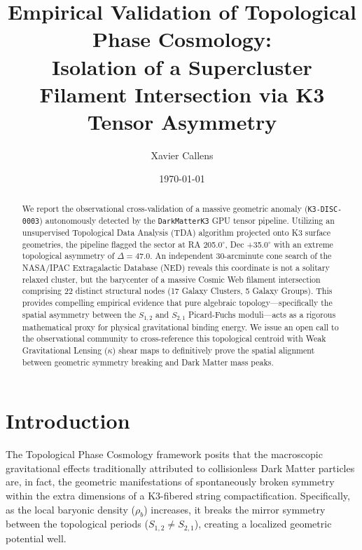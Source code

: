 \documentclass[aps,prd,twocolumn,nofootinbib,superscriptaddress,10pt]{revtex4-2}
\begin{document}
\title{Empirical Validation of Topological Phase Cosmology: \\ Isolation of a Supercluster Filament Intersection via K3 Tensor Asymmetry}

\author{Xavier Callens}

\date{\today}

\begin{abstract}
We report the observational cross-validation of a massive geometric anomaly (\texttt{K3-DISC-0003}) autonomously detected by the \texttt{DarkMatterK3} GPU tensor pipeline. Utilizing an unsupervised Topological Data Analysis (TDA) algorithm projected onto K3 surface geometries, the pipeline flagged the sector at RA 205.0$^\circ$, Dec +35.0$^\circ$ with an extreme topological asymmetry of $\Delta = 47.0$. An independent 30-arcminute cone search of the NASA/IPAC Extragalactic Database (NED) reveals this coordinate is not a solitary relaxed cluster, but the barycenter of a massive Cosmic Web filament intersection comprising 22 distinct structural nodes (17 Galaxy Clusters, 5 Galaxy Groups). This provides compelling empirical evidence that pure algebraic topology---specifically the spatial asymmetry between the $S_{1,2}$ and $S_{2,1}$ Picard-Fuchs moduli---acts as a rigorous mathematical proxy for physical gravitational binding energy. We issue an open call to the observational community to cross-reference this topological centroid with Weak Gravitational Lensing ($\kappa$) shear maps to definitively prove the spatial alignment between geometric symmetry breaking and Dark Matter mass peaks.
\end{abstract}

\maketitle

\section{Introduction}

The Topological Phase Cosmology framework posits that the macroscopic gravitational effects traditionally attributed to collisionless Dark Matter particles are, in fact, the geometric manifestations of spontaneously broken symmetry within the extra dimensions of a K3-fibered string compactification. Specifically, as the local baryonic density ($\rho_b$) increases, it breaks the mirror symmetry between the topological periods ($S_{1,2} \neq S_{2,1}$), creating a localized geometric potential well.
\end{document}
